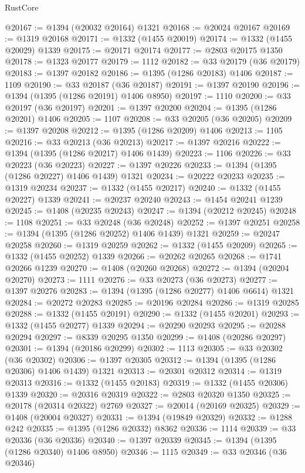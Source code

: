 \begin{lexlean}{RustCore}
\begin{coremodule}
@20167 := @1394 (@20032 @20164) @1321
@20168 := @20024 @20167
@20169 := @1319 @20168
@20171 := @1332 (@1455 @20019)
@20174 := @1332 (@1455 @20029) @1339
@20175 := @20171 @20174
@20177 := @2803 @20175 @1350
@20178 := @1323 @20177
@20179 := 1112
@20182 := @33 @20179 (@36 @20179)
@20183 := @1397 @20182
@20186 := @1395 (@1286 @20183) @1406
@20187 := 1109
@20190 := @33 @20187 (@36 @20187)
@20191 := @1397 @20190
@20196 := @1394 (@1395 (@1286 @20191) @1406 @8950)
@20197 := 1110
@20200 := @33 @20197 (@36 @20197)
@20201 := @1397 @20200
@20204 := @1395 (@1286 @20201) @1406
@20205 := 1107
@20208 := @33 @20205 (@36 @20205)
@20209 := @1397 @20208
@20212 := @1395 (@1286 @20209) @1406
@20213 := 1105
@20216 := @33 @20213 (@36 @20213)
@20217 := @1397 @20216
@20222 := @1394 (@1395 (@1286 @20217) @1406 @1439)
@20223 := 1106
@20226 := @33 @20223 (@36 @20223)
@20227 := @1397 @20226
@20233 := @1394 (@1395 (@1286 @20227) @1406 @1439) @1321
@20234 := @20222 @20233
@20235 := @1319 @20234
@20237 := @1332 (@1455 @20217)
@20240 := @1332 (@1455 @20227) @1339
@20241 := @20237 @20240
@20243 := @1454 @20241 @1239
@20245 := @1408 (@20235 @20243)
@20247 := @1394 (@20212 @20245)
@20248 := 1108
@20251 := @33 @20248 (@36 @20248)
@20252 := @1397 @20251
@20258 := @1394 (@1395 (@1286 @20252) @1406 @1439) @1321
@20259 := @20247 @20258
@20260 := @1319 @20259
@20262 := @1332 (@1455 @20209)
@20265 := @1332 (@1455 @20252) @1339
@20266 := @20262 @20265
@20268 := @1741 @20266 @1239
@20270 := @1408 (@20260 @20268)
@20272 := @1394 (@20204 @20270)
@20273 := 1111
@20276 := @33 @20273 (@36 @20273)
@20277 := @1397 @20276
@20283 := @1394 (@1395 (@1286 @20277) @1406 @6614) @1321
@20284 := @20272 @20283
@20285 := @20196 @20284
@20286 := @1319 @20285
@20288 := @1332 (@1455 @20191)
@20290 := @1332 (@1455 @20201)
@20293 := @1332 (@1455 @20277) @1339
@20294 := @20290 @20293
@20295 := @20288 @20294
@20297 := @8339 @20295 @1350
@20299 := @1408 (@20286 @20297)
@20301 := @1394 (@20186 @20299)
@20302 := 1113
@20305 := @33 @20302 (@36 @20302)
@20306 := @1397 @20305
@20312 := @1394 (@1395 (@1286 @20306) @1406 @1439) @1321
@20313 := @20301 @20312
@20314 := @1319 @20313
@20316 := @1332 (@1455 @20183)
@20319 := @1332 (@1455 @20306) @1339
@20320 := @20316 @20319
@20322 := @2803 @20320 @1350
@20325 := @20178 (@20314 @20322) @2769
@20327 := @20014 (@20169 @20325)
@20329 := @1408 (@20004 @20327)
@20331 := @1394 (@19849 @20329)
@20332 := @1288 @242
@20335 := @1395 (@1286 @20332) @8362
@20336 := 1114
@20339 := @33 @20336 (@36 @20336)
@20340 := @1397 @20339
@20345 := @1394 (@1395 (@1286 @20340) @1406 @8950)
@20346 := 1115
@20349 := @33 @20346 (@36 @20346)

\end{coremodule}
\end{lexlean}
